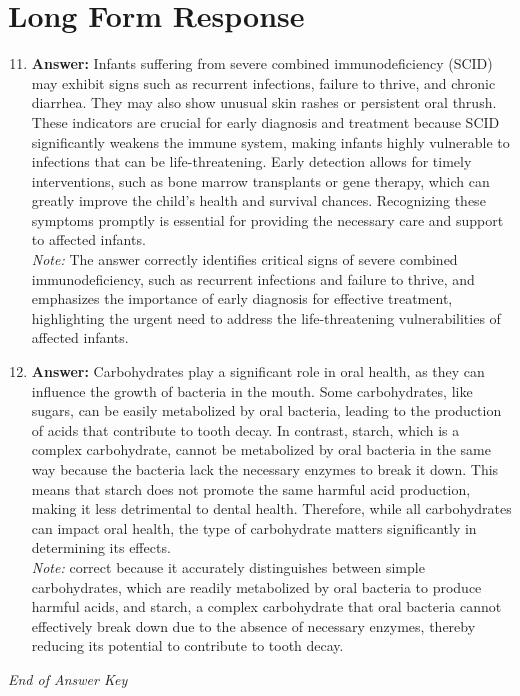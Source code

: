 \documentclass[12pt]{article}
\begin{document}
\section*{Long Form Response}
\begin{enumerate}[label=\arabic*.]
\setcounter{enumi}{10}
\item \textbf{Answer:} Infants suffering from severe combined immunodeficiency (SCID) may exhibit signs such as recurrent infections, failure to thrive, and chronic diarrhea. They may also show unusual skin rashes or persistent oral thrush. These indicators are crucial for early diagnosis and treatment because SCID significantly weakens the immune system, making infants highly vulnerable to infections that can be life-threatening. Early detection allows for timely interventions, such as bone marrow transplants or gene therapy, which can greatly improve the child's health and survival chances. Recognizing these symptoms promptly is essential for providing the necessary care and support to affected infants.
\\ \textit{Note:} The answer correctly identifies critical signs of severe combined immunodeficiency, such as recurrent infections and failure to thrive, and emphasizes the importance of early diagnosis for effective treatment, highlighting the urgent need to address the life-threatening vulnerabilities of affected infants.
\item \textbf{Answer:} Carbohydrates play a significant role in oral health, as they can influence the growth of bacteria in the mouth. Some carbohydrates, like sugars, can be easily metabolized by oral bacteria, leading to the production of acids that contribute to tooth decay. In contrast, starch, which is a complex carbohydrate, cannot be metabolized by oral bacteria in the same way because the bacteria lack the necessary enzymes to break it down. This means that starch does not promote the same harmful acid production, making it less detrimental to dental health. Therefore, while all carbohydrates can impact oral health, the type of carbohydrate matters significantly in determining its effects.
\\ \textit{Note:} correct because it accurately distinguishes between simple carbohydrates, which are readily metabolized by oral bacteria to produce harmful acids, and starch, a complex carbohydrate that oral bacteria cannot effectively break down due to the absence of necessary enzymes, thereby reducing its potential to contribute to tooth decay.
\end{enumerate}

\vfill
\noindent\textit{End of Answer Key}
\end{document}
